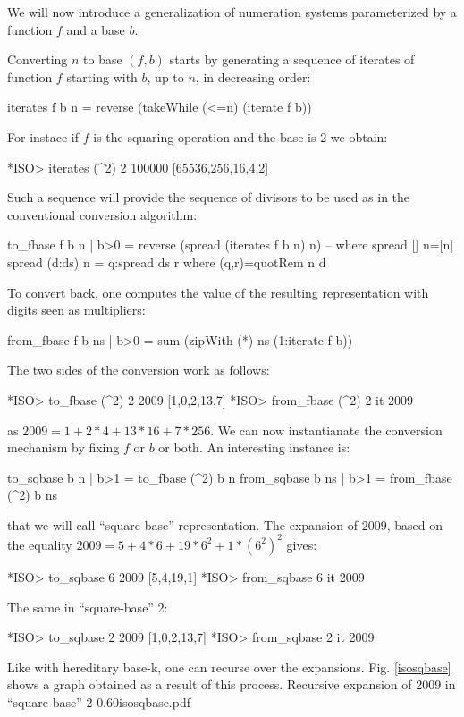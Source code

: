 \documentclass[]{INCLUDES/llncs}
\begin{document}
We will now introduce a
generalization of numeration systems parameterized 
by a function $f$ and a base $b$.

Converting $n$ to base $(f,b)$ starts by generating a sequence of
iterates of function $f$ starting with $b$, up to $n$, in decreasing order:
\begin{code}
iterates f b n = reverse (takeWhile (<=n) (iterate f b))
\end{code}
For instace if $f$ is the squaring operation and the base is $2$ we obtain:
\begin{codex}
*ISO> iterates (^2) 2 100000
[65536,256,16,4,2]
\end{codex}
Such a sequence will provide the sequence of divisors to be used as in the
conventional conversion algorithm:
\begin{code}
to_fbase f b n | b>0 = reverse (spread (iterates f b n) n) -- where
spread [] n=[n]
spread (d:ds) n = q:spread ds r where (q,r)=quotRem n d
\end{code}
To convert back, one computes the value of the resulting representation with
digits seen as multipliers:
\begin{code}    
from_fbase f b ns | b>0 = sum (zipWith (*) ns (1:iterate f b))
\end{code}
The two sides of the conversion work as follows:
\begin{codex}
*ISO> to_fbase (^2) 2 2009
[1,0,2,13,7]
*ISO> from_fbase (^2) 2 it
2009
\end{codex}
as $2009=1+2*4+13*16+7*256$.
We can now instantianate the conversion mechanism by fixing $f$ or $b$ or
both. An interesting instance is:
\begin{code}
to_sqbase b n | b>1 = to_fbase (^2) b n
from_sqbase b ns | b>1 = from_fbase (^2) b ns
\end{code}
that we will call ``square-base'' representation.
The expansion of $2009$, based on the equality $2009=5+4*6+19*6^2+1*{(6^2)}^2$
gives:
\begin{codex}
*ISO> to_sqbase 6 2009
[5,4,19,1]
*ISO> from_sqbase 6 it
2009
\end{codex}
The same in ``square-base'' 2:
\begin{codex}
*ISO> to_sqbase 2 2009
[1,0,2,13,7]
*ISO> from_sqbase 2 it
2009
\end{codex}
Like with hereditary base-k, one can recurse over the expansions.
Fig. \ref{isosqbase} shows a graph obtained as a result of this process.
{Recursive expansion of 2009 in ``square-base'' 2}
{0.60}{isosqbase.pdf}
\end{document}
